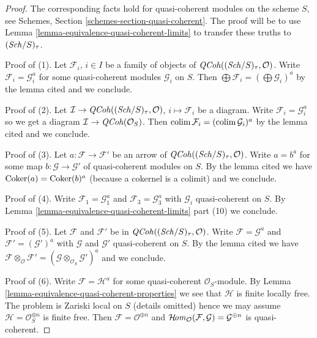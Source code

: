 \begin{proof}
The corresponding facts hold for quasi-coherent modules on the scheme $S$,
see Schemes, Section \ref{schemes-section-quasi-coherent}. The proof will
be to use Lemma \ref{lemma-equivalence-quasi-coherent-limits} to transfer
these truths to $(\mathit{Sch}/S)_\tau$.

\medskip\noindent
Proof of (1). Let $\mathcal{F}_i$, $i \in I$ be a family of objects of
$\mathit{QCoh}((\mathit{Sch}/S)_\tau, \mathcal{O})$. Write $\mathcal{F}_i = \mathcal{G}_i^a$
for some quasi-coherent modules $\mathcal{G}_i$ on $S$.
Then $\bigoplus \mathcal{F}_i = (\bigoplus \mathcal{G}_i)^a$ by
the lemma cited and we conclude.

\medskip\noindent
Proof of (2). Let $\mathcal{I} \to \mathit{QCoh}((\mathit{Sch}/S)_\tau, \mathcal{O})$,
$i \mapsto \mathcal{F}_i$ be a diagram. Write
$\mathcal{F}_i = \mathcal{G}_i^a$ so we get a diagram
$\mathcal{I} \to \mathit{QCoh}(\mathcal{O}_S)$.
Then $\mathop{\mathrm{colim}}\nolimits \mathcal{F}_i = (\mathop{\mathrm{colim}}\nolimits \mathcal{G}_i)^a$ by
the lemma cited and we conclude.

\medskip\noindent
Proof of (3). Let $a : \mathcal{F} \to \mathcal{F}'$
be an arrow of $\mathit{QCoh}((\mathit{Sch}/S)_\tau, \mathcal{O})$.
Write $a = b^a$ for some map $b : \mathcal{G} \to \mathcal{G}'$
of quasi-coherent modules on $S$. By the lemma cited
we have $\mathop{\mathrm{Coker}}(a) = \mathop{\mathrm{Coker}}(b)^a$ (because a cokernel is a colimit)
and we conclude.

\medskip\noindent
Proof of (4). Write $\mathcal{F}_1 = \mathcal{G}_1^a$
and $\mathcal{F}_3 = \mathcal{G}_3^a$ with
$\mathcal{G}_i$ quasi-coherent on $S$.
By Lemma \ref{lemma-equivalence-quasi-coherent-limits} part (10)
we conclude.

\medskip\noindent
Proof of (5). Let $\mathcal{F}$ and $\mathcal{F}'$ be in
$\mathit{QCoh}((\mathit{Sch}/S)_\tau, \mathcal{O})$. Write $\mathcal{F} = \mathcal{G}^a$
and $\mathcal{F}' = (\mathcal{G}')^a$
with $\mathcal{G}$ and $\mathcal{G}'$ quasi-coherent on $S$.
By the lemma cited we have
$\mathcal{F} \otimes_\mathcal{O} \mathcal{F}' =
(\mathcal{G} \otimes_{\mathcal{O}_S} \mathcal{G}')^a$
and we conclude.

\medskip\noindent
Proof of (6). Write $\mathcal{F} = \mathcal{H}^a$ for some
quasi-coherent $\mathcal{O}_S$-module. By
Lemma \ref{lemma-equivalence-quasi-coherent-properties}
we see that $\mathcal{H}$ is finite locally free.
The problem is Zariski local on $S$ (details omitted) hence
we may assume $\mathcal{H} = \mathcal{O}_S^{\oplus n}$ is
finite free. Then $\mathcal{F} = \mathcal{O}^{\oplus n}$
and $\mathop{\mathcal{H}\!\mathit{om}}\nolimits_\mathcal{O}(\mathcal{F}, \mathcal{G}) = \mathcal{G}^{\oplus n}$
is quasi-coherent.
\end{proof}

